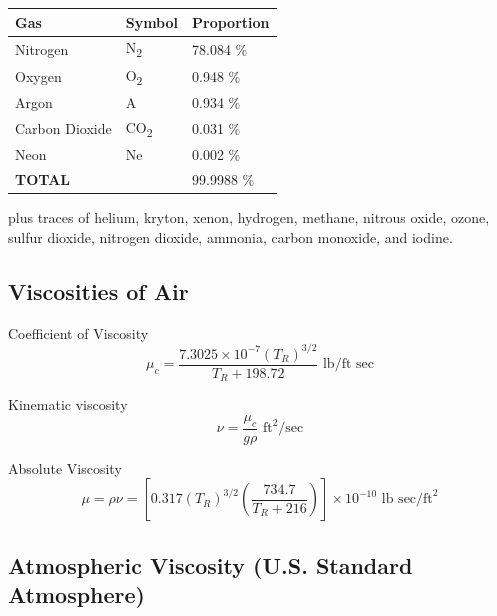 \documentclass[
]{book}
\begin{document}
\begin{longtable}[]{@{}lll@{}}
\toprule
Gas & Symbol & Proportion\tabularnewline
\midrule
\endhead
Nitrogen & N\textsubscript{2} & 78.084 \%\tabularnewline
Oxygen & O\textsubscript{2} & 0.948 \%\tabularnewline
Argon & A & 0.934 \%\tabularnewline
Carbon Dioxide & CO\textsubscript{2} & 0.031 \%\tabularnewline
Neon & Ne & 0.002 \%\tabularnewline
\textbf{TOTAL} & & 99.9988 \%\tabularnewline
\bottomrule
\end{longtable}

plus traces of helium, kryton, xenon, hydrogen, methane, nitrous oxide, ozone, sulfur dioxide, nitrogen dioxide, ammonia, carbon monoxide, and iodine.

\hypertarget{viscosities-of-air}{%
\subsection*{Viscosities of Air}\label{viscosities-of-air}}

Coefficient of Viscosity
\[ \mu_c = \frac{7.3025 \times 10^{-7} \left(T_R \right)^{3/2}}{T_R + 198.72} \text{ lb/ft sec}\]

Kinematic viscosity
\[ \nu = \frac{\mu_c}{g\rho} \text{ ft}^{2}\text{/sec} \]

Absolute Viscosity
\[ \mu = \rho\nu = \left[ 0.317 \left(T_R\right)^{3/2} \left( \frac{734.7}{T_R + 216} \right) \right] \times 10^{-10} \text{ lb sec/ft}^{2} \]

\hypertarget{atmospheric-viscosity-u.s.-standard-atmosphere}{%
\subsection*{Atmospheric Viscosity (U.S. Standard Atmosphere)}\label{atmospheric-viscosity-u.s.-standard-atmosphere}}
\end{document}
